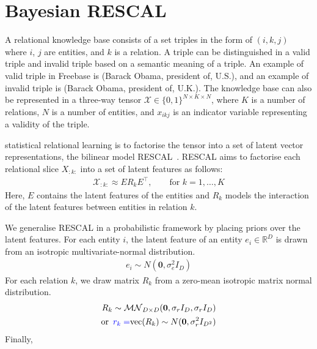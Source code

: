 \section{Bayesian RESCAL}
\label{sec:brescal}
A relational knowledge base consists of a set triples in the form of $(i, k, j)$ 
where $i$, $j$ are entities, and $k$ is a relation. A triple can be distinguished 
in a valid triple and invalid triple based on a semantic meaning of a triple. An 
example of valid triple in Freebase is (Barack Obama, president of, U.S.), and an 
example of invalid triple is (Barack Obama, president of, U.K.).
The knowledge base can also be represented in a three-way tensor 
$\mathcal{X} \in \{0, 1\}^{N \times K \times N}$, where $K$ is a number of 
relations, $N$ is a number of entities, and $x_{ikj}$ is an indicator variable 
representing a validity of the triple. 

 statistical relational learning is to factorise the tensor into a 
set of latent vector representations,  the bilinear model RESCAL~\cite{nickel2011three}.
RESCAL 
aims to factorise each relational slice $X_{:k:}$ into a set of  latent 
features as follows:
\begin{align}
\mathcal{X}_{:k:} \approx E R_k E^\top, \qquad \text{for } k = 1, \dots, K
\end{align}
Here, $E$ contains the latent features of the 
entities and $R_k$  models the interaction of the 
latent features between entities in relation $k$.

We generalise RESCAL in a probabilistic framework by placing priors over the 
latent features. For each entity $i$, the latent feature of an entity $e_i \in 
\mathbb{R}^{D}$ is drawn from an isotropic multivariate-normal distribution.
\begin{align}
\label{eqn:entity_gen}
e_i \sim {N}(\mathbf{0}, \sigma_e^2{I}_D)
\end{align}
For each relation $k$, we draw matrix $R_k$ from 
a zero-mean isotropic matrix normal distribution.
\begin{align}
\label{eqn:relation_gen}
R_k \sim \mathcal{MN}_{D \times D}(\mathbf{0}, \sigma_r{I}_D, \sigma_r{I}_D) \\
\text{or}\enspace {\color{blue}{r_k  =}} \text{vec}(R_k) \sim N(\mathbf{0}, \sigma_r^2 I_{D^2}) \notag
\end{align} %
Finally, 


